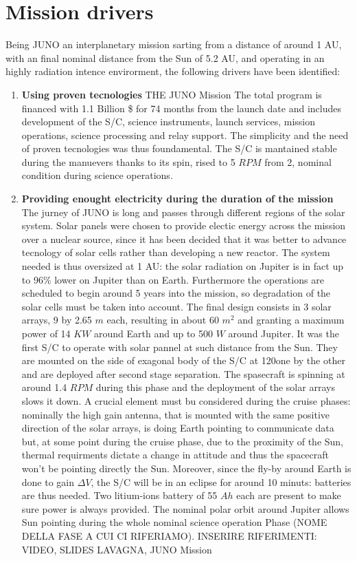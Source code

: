 \section{Mission drivers}
\label{sec:drivers}

Being JUNO an interplanetary mission sarting from a distance of around 1 AU, with an final nominal distance from the Sun of 5.2 AU, and operating in an highly radiation intence envirorment, the following drivers have been identified: 

\begin{enumerate}[leftmargin=1.5em]
    \item \textbf{Using proven tecnologies} THE JUNO Mission
    \newline The total program is financed with 1.1 Billion \$ for 74 months from the launch date and includes development of the S/C, science instruments, launch services, mission operations, science processing and relay support. The simplicity and the need of proven tecnologies was thus foundamental. The S/C is mantained stable during the manuevers thanks to its spin, rised to 5 $RPM$ from 2, nominal condition during science operations. 
    \item \textbf{Providing enought electricity during the duration of the mission} 
    \label{solar drivers}
    \newline The jurney of JUNO is long and passes through different regions of the solar system. Solar panels were chosen to provide electic energy across the mission over a nuclear source, since it has been decided that it was better to advance tecnology of solar cells rather than developing a new reactor. The system needed is thus oversized at 1 AU: the solar radiation on Jupiter is in fact up to 96\% lower on Jupiter than on Earth. Furthermore the operations are scheduled to begin around 5 years into the mission, so degradation of the solar cells must be taken into account. The final design consists in 3 solar arrays, 9 by 2.65 $m$ each, resulting in about 60 $m^2$ and granting a maximum power of 14 $KW$ around Earth and up to 500 $W$ around Jupiter. It was the first S/C to operate with solar pannel at such distance from the Sun. They are mounted on the side of exagonal body of the S/C at 120\textdegree one by the other and are deployed after second stage separation. The spasecraft is spinning at around 1.4 $RPM$ during this phase and the deployment of the solar arrays slows it down. A crucial element must bu considered during the cruise phases: nominally the high gain antenna, that is mounted with the same positive direction of the solar arrays, is doing Earth pointing to communicate data but, at some point during the cruise phase, due to the proximity of the Sun, thermal requirments dictate a change in attitude and thus the spacecraft won't be pointing directly the Sun. Moreover, since the fly-by around Earth is done to gain $\Delta V$, the S/C will be in an eclipse for around 10 minuts: batteries are thus needed. Two litium-ions battery of 55 $Ah$ each are present to make sure power is always provided. The nominal polar orbit around Jupiter allows Sun pointing during the whole nominal science operation Phase (NOME DELLA FASE A CUI CI RIFERIAMO).              INSERIRE RIFERIMENTI: VIDEO, SLIDES LAVAGNA, JUNO Mission

\end{enumerate}
